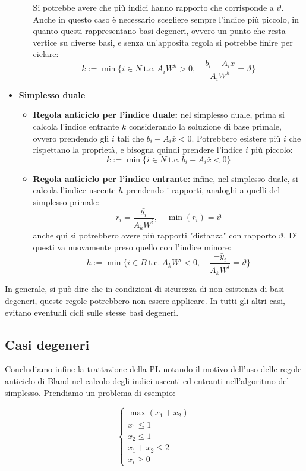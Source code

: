\documentclass[a4paper,11pt]{article}
\begin{document}
\begin{itemize}
\begin{itemize}
				Si potrebbe avere che più indici hanno rapporto che corrisponde a $\vartheta$. 
				Anche in questo caso è necessario scegliere sempre l'indice più piccolo, in quanto questi rappresentano basi degeneri, ovvero un punto che resta vertice su diverse basi, e senza un'apposita regola si potrebbe finire per ciclare:
		$$ 
		k := \min\{ i \in N \ \text{t.c.} \ A_i W^h > 0, \quad \frac{b_i - A_i \bar{x}}{A_i W^h} = \vartheta \} 
		$$
		\end{itemize}
	\item \textbf{\textsf{Simplesso duale}}
		\begin{itemize}
			\item \textbf{Regola anticiclo per l'indice duale:} 
				nel simplesso duale, prima si calcola l'indice entrante $k$ considerando la soluzione di base primale, ovvero prendendo gli $i$ tali che $b_i - A_i \bar{x} < 0$.
				Potrebbero esistere più $i$ che rispettano la proprietà, e bisogna quindi prendere l'indice $i$ più piccolo:
		$$
		k := \min\{ i \in N \ \text{t.c.} \ b_i - A_i \bar{x} < 0 \}
		$$
			\item \textbf{Regola anticiclo per l'indice entrante:} 
				infine, nel simplesso duale, si calcola l'indice uscente $h$ prendendo i rapporti, analoghi a quelli del simplesso primale:
				$$
					r_i = \frac{\bar{y_i}}{A_k W^i}, \quad \min(r_i) = \vartheta
				$$
				anche qui si potrebbero avere più rapporti "distanza" con rapporto $\vartheta$.
				Di questi va nuovamente preso quello con l'indice minore:
		$$ 
		h := \min\{ i \in B \ \text{t.c.} \ A_k W^i < 0, \quad \frac{-\bar{y}_i}{A_kW^i} = \vartheta \}	
		$$
		\end{itemize}
\end{itemize}

In generale, si può dire che in condizioni di sicurezza di non esistenza di basi degeneri, queste regole potrebbero non essere applicare.
In tutti gli altri casi, evitano eventuali cicli sulle stesse basi degeneri.

\subsection{Casi degeneri}
Concludiamo infine la trattazione della PL notando il motivo dell'uso delle regole anticiclo di Bland nel calcolo degli indici uscenti ed entranti nell'algoritmo del simplesso.
Prendiamo un problema di esempio:

\[
	\begin{cases}
		\max(x_1 + x_2) \\ 
		x_1 \leq 1 \\ 
		x_2 \leq 1 \\ 
		x_1 + x_2 \leq 2 \\ 
		x_i \geq 0
	\end{cases}
\]
\end{document}
